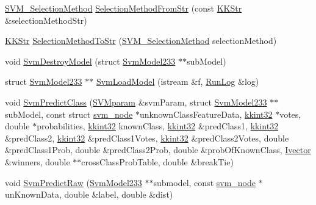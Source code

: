 \begin{DoxyCompactItemize}
\item 
\hyperlink{namespace_k_k_m_l_l_afab7be632987641e5805e770be7f6bf8}{S\+V\+M\+\_\+\+Selection\+Method} \hyperlink{namespace_k_k_m_l_l_af92818c3487e45a3debbd91aa263cca6}{Selection\+Method\+From\+Str} (const \hyperlink{class_k_k_b_1_1_k_k_str}{K\+K\+Str} \&selection\+Method\+Str)
\item 
\hyperlink{class_k_k_b_1_1_k_k_str}{K\+K\+Str} \hyperlink{namespace_k_k_m_l_l_a836f83cedfbe3985d00997edec28716f}{Selection\+Method\+To\+Str} (\hyperlink{namespace_k_k_m_l_l_afab7be632987641e5805e770be7f6bf8}{S\+V\+M\+\_\+\+Selection\+Method} selection\+Method)
\item 
void \hyperlink{namespace_k_k_m_l_l_a07340d912a278e2cfea411b27a6c6a38}{Svm\+Destroy\+Model} (struct \hyperlink{struct_s_v_m233_1_1_svm_model233}{Svm\+Model233} $\ast$$\ast$sub\+Model)
\item 
struct \hyperlink{struct_s_v_m233_1_1_svm_model233}{Svm\+Model233} $\ast$$\ast$ \hyperlink{namespace_k_k_m_l_l_ac9ff0c69da87de2e5f1acbf3ecb753e8}{Svm\+Load\+Model} (istream \&f, \hyperlink{class_k_k_b_1_1_run_log}{Run\+Log} \&log)
\item 
void \hyperlink{namespace_k_k_m_l_l_a658f1d24f059e14b27229482d01e0400}{Svm\+Predict\+Class} (\hyperlink{class_k_k_m_l_l_1_1_s_v_mparam}{S\+V\+Mparam} \&svm\+Param, struct \hyperlink{struct_s_v_m233_1_1_svm_model233}{Svm\+Model233} $\ast$$\ast$sub\+Model, const struct \hyperlink{struct_s_v_m233_1_1svm__node}{svm\+\_\+node} $\ast$unknown\+Class\+Feature\+Data, \hyperlink{namespace_k_k_b_a8fa4952cc84fda1de4bec1fbdd8d5b1b}{kkint32} $\ast$votes, double $\ast$probabilities, \hyperlink{namespace_k_k_b_a8fa4952cc84fda1de4bec1fbdd8d5b1b}{kkint32} known\+Class, \hyperlink{namespace_k_k_b_a8fa4952cc84fda1de4bec1fbdd8d5b1b}{kkint32} \&pred\+Class1, \hyperlink{namespace_k_k_b_a8fa4952cc84fda1de4bec1fbdd8d5b1b}{kkint32} \&pred\+Class2, \hyperlink{namespace_k_k_b_a8fa4952cc84fda1de4bec1fbdd8d5b1b}{kkint32} \&pred\+Class1\+Votes, \hyperlink{namespace_k_k_b_a8fa4952cc84fda1de4bec1fbdd8d5b1b}{kkint32} \&pred\+Class2\+Votes, double \&pred\+Class1\+Prob, double \&pred\+Class2\+Prob, double \&prob\+Of\+Known\+Class, \hyperlink{namespace_k_k_m_l_l_a7dfbe1447876f5f737f0dce1c02ce85c}{Ivector} \&winners, double $\ast$$\ast$cross\+Class\+Prob\+Table, double \&break\+Tie)
\item 
void \hyperlink{namespace_k_k_m_l_l_af6a8aee2aad78a52bbec33f12e9d2960}{Svm\+Predict\+Raw} (\hyperlink{struct_s_v_m233_1_1_svm_model233}{Svm\+Model233} $\ast$$\ast$submodel, const \hyperlink{struct_s_v_m233_1_1svm__node}{svm\+\_\+node} $\ast$un\+Known\+Data, double \&label, double \&dist)
$$
\end{DoxyCompactItemize}
